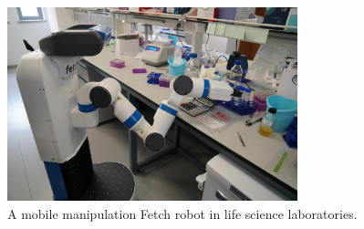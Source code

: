 \documentclass[12pt,draftclsnofoot,onecolumn]{IEEEtran}
\begin{document}
	\begin{figure}[H]
		\centering
		\includegraphics[width=0.75\textwidth]{img/robot.jpg}
		\caption{
			A mobile manipulation Fetch robot in life science laboratories.
		}
		\label{robot}
	\end{figure}

	
	
	
	
\end{document}
